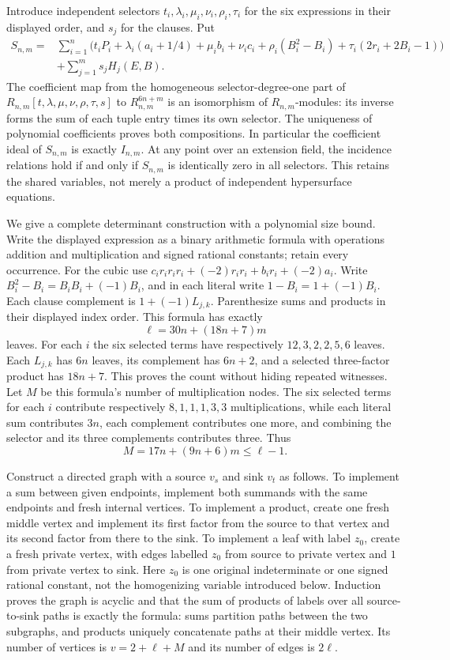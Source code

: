 Introduce independent selectors
$t_i,\lambda_i,\mu_i,\nu_i,\rho_i,\tau_i$ for the six
expressions in their displayed order, and $s_j$ for the clauses. Put
\begin{align*}
 S_{n,m}={}&\sum_{i=1}^n\bigl(t_iP_i+\lambda_i(a_i+1/4)
   +\mu_i b_i+\nu_i c_i+\rho_i(B_i^2-B_i)
   +\tau_i(2r_i+2B_i-1)\bigr)\\
 &+\sum_{j=1}^m s_jH_j(E,B).
\end{align*}
The coefficient map from the homogeneous selector-degree-one part
of $R_{n,m}[t,\lambda,\mu,\nu,\rho,\tau,s]$ to
$R_{n,m}^{6n+m}$ is an isomorphism of $R_{n,m}$-modules: its
inverse forms the sum of each tuple entry times its own selector.
The uniqueness of polynomial coefficients proves both compositions.
In particular the coefficient ideal of $S_{n,m}$ is exactly
$I_{n,m}$. At any point over an extension field, the incidence
relations hold if and only if $S_{n,m}$ is identically zero in all
selectors. This retains the shared variables, not merely a product
of independent hypersurface equations.

We give a complete determinant construction with a polynomial size
bound. Write the displayed expression as a binary arithmetic formula
with operations addition and multiplication and signed rational
constants; retain every occurrence. For the cubic use
$c_i r_i r_i r_i+(-2)r_i r_i+b_i r_i+(-2)a_i$.
Write $B_i^2-B_i=B_iB_i+(-1)B_i$, and in each literal write
$1-B_i=1+(-1)B_i$. Each clause complement is
$1+(-1)L_{j,k}$. Parenthesize sums and products in their displayed
index order. This formula has exactly
\[
 \ell=30n+(18n+7)m
\]
leaves. For each $i$ the six selected terms have respectively
$12,3,2,2,5,6$ leaves. Each $L_{j,k}$ has $6n$ leaves, its
complement has $6n+2$, and a selected three-factor product has
$18n+7$. This proves the count without hiding repeated witnesses.
Let $M$ be this formula's number of multiplication nodes. The six
selected terms for each $i$ contribute respectively $8,1,1,1,3,3$
multiplications, while each literal sum contributes $3n$, each
complement contributes one more, and combining the selector and its
three complements contributes three. Thus
\[
 M=17n+(9n+6)m\le\ell-1.
\]

Construct a directed graph with a source $v_s$ and sink $v_t$ as
follows. To implement a sum between given endpoints, implement both
summands with the same endpoints and fresh internal vertices. To
implement a product, create one fresh middle vertex and implement
its first factor from the source to that vertex and its second factor
from there to the sink. To implement a leaf with label $z_0$, create
a fresh private vertex, with edges labelled $z_0$ from source to
private vertex and $1$ from private vertex to sink. Here $z_0$ is
one original indeterminate or one signed rational constant, not the
homogenizing variable introduced below. Induction proves the graph
is acyclic and that the sum of products of labels over all source-to-sink
paths is exactly the formula: sums partition paths between the two
subgraphs, and products uniquely concatenate paths at their middle
vertex. Its number of vertices is
$v=2+\ell+M$ and its number of edges is $2\ell$.

